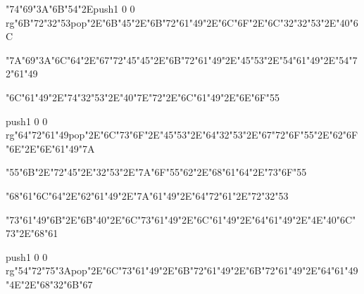 \centerline{\ipa\char"74\ipa\char"69\ipa\char"3A\ipa\char"6B\ipa\char"54\ipa\char"2E\pdfcolorstack\match push{1 0 0 rg}\ipa\char"6B\ipa\char"72\ipa\char"32\ipa\char"53\pdfcolorstack\match pop{}\ipa\char"2E\ipa\char"6B\ipa\char"45\ipa\char"2E\ipa\char"6B\ipa\char"72\ipa\char"61\ipa\char"49\ipa\char"2E\ipa\char"6C\ipa\char"6F\ipa\char"2E\ipa\char"6C\ipa\char"32\ipa\char"32\ipa\char"53\ipa\char"2E\ipa\char"40\ipa\char"6C}\bigskip
\centerline{\ipa\char"7A\ipa\char"69\ipa\char"3A\ipa\char"6C\ipa\char"64\ipa\char"2E\ipa\char"67\ipa\char"72\ipa\char"45\ipa\char"45\ipa\char"2E\ipa\char"6B\ipa\char"72\ipa\char"61\ipa\char"49\ipa\char"2E\ipa\char"45\ipa\char"53\ipa\char"2E\ipa\char"54\ipa\char"61\ipa\char"49\ipa\char"2E\ipa\char"54\ipa\char"72\ipa\char"61\ipa\char"49}
\vfill\eject
\null\vfill
\centerline{\ipa\char"6C\ipa\char"61\ipa\char"49\ipa\char"2E\ipa\char"74\ipa\char"32\ipa\char"53\ipa\char"2E\ipa\char"40\ipa\char"7E\ipa\char"72\ipa\char"2E\ipa\char"6C\ipa\char"61\ipa\char"49\ipa\char"2E\ipa\char"6E\ipa\char"6F\ipa\char"55}\bigskip
\centerline{\pdfcolorstack\match push{1 0 0 rg}\ipa\char"64\ipa\char"72\ipa\char"61\ipa\char"49\pdfcolorstack\match pop{}\ipa\char"2E\ipa\char"6C\ipa\char"73\ipa\char"6F\ipa\char"2E\ipa\char"45\ipa\char"53\ipa\char"2E\ipa\char"64\ipa\char"32\ipa\char"53\ipa\char"2E\ipa\char"67\ipa\char"72\ipa\char"6F\ipa\char"55\ipa\char"2E\ipa\char"62\ipa\char"6F\ipa\char"6E\ipa\char"2E\ipa\char"6E\ipa\char"61\ipa\char"49\ipa\char"7A}\bigskip
\centerline{\ipa\char"55\ipa\char"6B\ipa\char"2E\ipa\char"72\ipa\char"45\ipa\char"2E\ipa\char"32\ipa\char"53\ipa\char"2E\ipa\char"7A\ipa\char"6F\ipa\char"55\ipa\char"62\ipa\char"2E\ipa\char"68\ipa\char"61\ipa\char"64\ipa\char"2E\ipa\char"73\ipa\char"6F\ipa\char"55}
\vfill\eject
\null\vfill
\centerline{\ipa\char"68\ipa\char"61\ipa\char"6C\ipa\char"64\ipa\char"2E\ipa\char"62\ipa\char"61\ipa\char"49\ipa\char"2E\ipa\char"7A\ipa\char"61\ipa\char"49\ipa\char"2E\ipa\char"64\ipa\char"72\ipa\char"61\ipa\char"2E\ipa\char"72\ipa\char"32\ipa\char"53}\bigskip
\centerline{\ipa\char"73\ipa\char"61\ipa\char"49\ipa\char"6B\ipa\char"2E\ipa\char"6B\ipa\char"40\ipa\char"2E\ipa\char"6C\ipa\char"73\ipa\char"61\ipa\char"49\ipa\char"2E\ipa\char"6C\ipa\char"61\ipa\char"49\ipa\char"2E\ipa\char"64\ipa\char"61\ipa\char"49\ipa\char"2E\ipa\char"4E\ipa\char"40\ipa\char"6C\ipa\char"73\ipa\char"2E\ipa\char"68\ipa\char"61}\bigskip
\centerline{\pdfcolorstack\match push{1 0 0 rg}\ipa\char"54\ipa\char"72\ipa\char"75\ipa\char"3A\pdfcolorstack\match pop{}\ipa\char"2E\ipa\char"6C\ipa\char"73\ipa\char"61\ipa\char"49\ipa\char"2E\ipa\char"6B\ipa\char"72\ipa\char"61\ipa\char"49\ipa\char"2E\ipa\char"6B\ipa\char"72\ipa\char"61\ipa\char"49\ipa\char"2E\ipa\char"64\ipa\char"61\ipa\char"49\ipa\char"4E\ipa\char"2E\ipa\char"68\ipa\char"32\ipa\char"6B\ipa\char"67}
